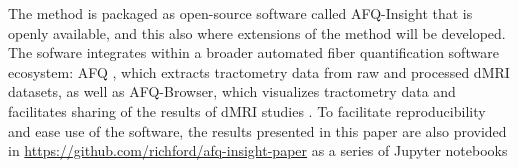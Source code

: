 The method is packaged as open-source software called AFQ-Insight that is openly
available, and this also where extensions of the method will be developed. The
sofware integrates within a broader automated fiber quantification software
ecosystem: AFQ \cite{yeatman2012tract}, which extracts tractometry data from raw
and processed dMRI datasets, as well as AFQ-Browser, which visualizes
tractometry data and facilitates sharing of the results of dMRI studies
\cite{yeatman2018browser}. To facilitate reproducibility and ease use of the
software, the results presented in this paper are also provided in
\url{https://github.com/richford/afq-insight-paper} as a series of Jupyter
notebooks
\cite{kluyver2016jupyter}

